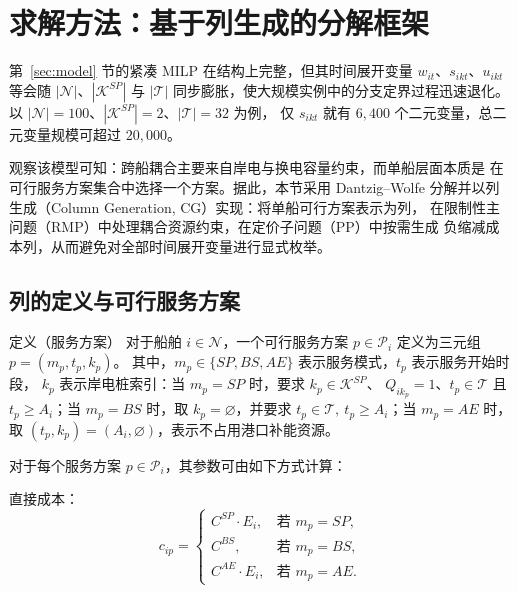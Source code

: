 \documentclass[UTF8, a4paper, 12pt]{ctexart}
\theoremstyle{plain}
\theoremstyle{definition}
\theoremstyle{remark}
\begin{document}

\section{求解方法：基于列生成的分解框架}
\label{sec:cg}

第~\ref{sec:model} 节的紧凑 MILP 在结构上完整，但其时间展开变量
$w_{it}$、$s_{ikt}$、$u_{ikt}$ 等会随 $|\mathcal{N}|$、$|\mathcal{K}^{SP}|$ 与
$|\mathcal{T}|$ 同步膨胀，使大规模实例中的分支定界过程迅速退化。
以 $|\mathcal{N}| = 100$、$|\mathcal{K}^{SP}| = 2$、$|\mathcal{T}| = 32$ 为例，
仅 $s_{ikt}$ 就有 $6{,}400$ 个二元变量，总二元变量规模可超过 $20{,}000$。

观察该模型可知：跨船耦合主要来自岸电与换电容量约束，而单船层面本质是
在可行服务方案集合中选择一个方案。据此，本节采用 Dantzig--Wolfe
分解并以列生成（Column Generation, CG）实现：将单船可行方案表示为列，
在限制性主问题（RMP）中处理耦合资源约束，在定价子问题（PP）中按需生成
负缩减成本列，从而避免对全部时间展开变量进行显式枚举。

\subsection{列的定义与可行服务方案}
\label{sec:cg_column}

\noindent 定义（服务方案） 对于船舶 $i \in \mathcal{N}$，一个可行服务方案
$p \in \mathcal{P}_i$ 定义为三元组 $p=(m_p,t_p,k_p)$。
其中，$m_p \in \{SP, BS, AE\}$ 表示服务模式，$t_p$ 表示服务开始时段，
$k_p$ 表示岸电桩索引：当 $m_p=SP$ 时，要求 $k_p \in \mathcal{K}^{SP}$、
$Q_{ik_p}=1$、$t_p \in \mathcal{T}$ 且 $t_p \ge A_i$；当 $m_p=BS$ 时，取
$k_p=\varnothing$，并要求 $t_p \in \mathcal{T},\ t_p \ge A_i$；当 $m_p=AE$
时，取 $(t_p,k_p)=(A_i,\varnothing)$，表示不占用港口补能资源。

\noindent
对于每个服务方案 $p \in \mathcal{P}_i$，其参数可由如下方式计算：

\medskip
\noindent 直接成本：
\begin{equation}
  c_{ip} =
  \begin{cases}
    C^{SP} \cdot E_i, & \text{若 } m_p = SP, \\
    C^{BS}, & \text{若 } m_p = BS, \\
    C^{AE} \cdot E_i, & \text{若 } m_p = AE.
  \end{cases}
  \label{eq:col_cost}
\end{equation}
\end{document}
